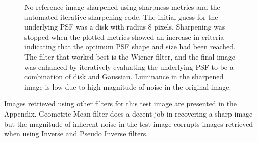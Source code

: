 \begin{figure}[H]
\begin{subfigure}[b]{0.49\textwidth}
        \end{subfigure}             
        \caption{ No reference image sharpened using sharpness metrics and the automated iterative sharpening code. The initial guess for the underlying PSF was a disk with radius 8 pixels. Sharpening was stopped when the plotted metrics showed an increase in criteria indicating that the optimum PSF shape and size had been reached. The filter that worked best is the Wiener filter, and the final image was enhanced by iteratively evaluating the underlying PSF to be a combination of disk and Gaussian. Luminance in the sharpened image is low due to high magnitude of noise in the original image.} \label{fig:true_metrics}
\end{figure}

\noindent Images retrieved using other filters for this test image are presented in the Appendix. Geometric Mean filter does a decent job in recovering a sharp image but the magnitude of inherent noise in the test image corrupts images retrieved when using Inverse and Pseudo Inverse filters.

\newpage